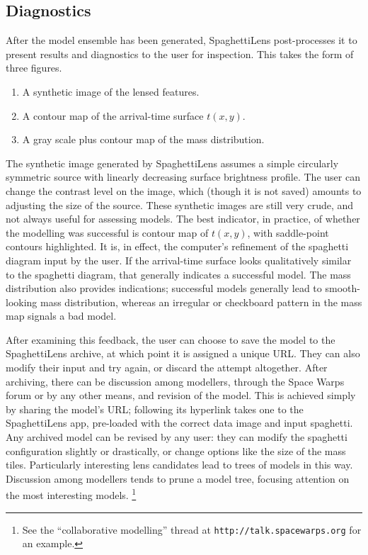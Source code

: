 \documentclass[usenatbib]{mn2e}
\newcommand{\spl}{SpaghettiLens\xspace}
\newcommand{\sw}{Space Warps\xspace}
\begin{document}

\subsection{Diagnostics} 
\label{sec:diag}

After the model ensemble has been generated, \spl post-processes it to
present results and diagnostics to the user for inspection. This takes
the form of three figures.
\begin{enumerate}
\item A synthetic image of the lensed features.
\item A contour map of the arrival-time surface $t(x,y)$.
\item A gray scale plus contour map of the mass distribution.
\end{enumerate}
The synthetic image generated by \spl assumes a simple
circularly symmetric source with linearly decreasing
surface brightness profile.  The user can change the contrast level
on the image, which (though it is not saved) amounts to adjusting the
size of the source. These synthetic images are still very
crude, and not always useful for assessing models.  The best
indicator, in practice, of whether the modelling was successful is
contour map of $t(x,y)$, with saddle-point contours highlighted.  It
is, in effect, the computer's refinement of the spaghetti diagram
input by the user.  If the arrival-time surface looks qualitatively
similar to the spaghetti diagram, that generally indicates a
successful model.  The mass distribution also provides indications;
successful models generally lead to smooth-looking mass distribution,
whereas an irregular or checkboard pattern in the mass map signals a
bad model.

After examining this feedback, the user can choose to save the
model to the \spl archive, at which point it is assigned a unique
URL.  They can also modify their input and try again, or discard the
attempt altogether.  After archiving, there can be discussion among
modellers, through the \sw forum or by any other means, and revision
of the model.  This is achieved simply by sharing the model's
URL; following its hyperlink takes one to the \spl app, pre-loaded
with the correct data image and input spaghetti. Any archived model
can be revised by any user: they can modify the spaghetti
configuration slightly or drastically, or change options like the size
of the mass tiles. Particularly interesting lens candidates lead to
trees of models in this way.  Discussion among modellers tends to
prune a model tree, focusing attention on the most interesting
models.
\footnote{See the ``collaborative modelling'' thread at 
{\tt http://talk.spacewarps.org} for an example.}
\end{document}
